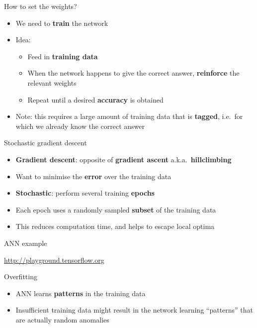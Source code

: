 \begin{frame}{How to set the weights?}
	\begin{itemize}
		\pause\item We need to \textbf{train} the network
		\pause\item Idea:
			\begin{itemize}
				\pause\item Feed in \textbf{training data}
				\pause\item When the network happens to give the correct answer, \textbf{reinforce}
					the relevant weights
				\pause\item Repeat until a desired \textbf{accuracy} is obtained
			\end{itemize}
		\pause\item Note: this requires a large amount of training data that is \textbf{tagged},
			i.e.\ for which we already know the correct answer
	\end{itemize}
\end{frame}

\begin{frame}{Stochastic gradient descent}
	\begin{itemize}
		\pause\item \textbf{Gradient descent}: opposite of \textbf{gradient ascent} a.k.a.\ \textbf{hillclimbing}
		\pause\item Want to minimise the \textbf{error} over the training data
		\pause\item \textbf{Stochastic}: perform several training \textbf{epochs}
		\pause\item Each epoch uses a randomly sampled \textbf{subset} of the training data
		\pause\item This reduces computation time, and helps to escape local optima
	\end{itemize}
\end{frame}

\begin{frame}{ANN example}
	\begin{center}
		\url{http://playground.tensorflow.org}
	\end{center}
\end{frame}

\begin{frame}{Overfitting}
	\begin{itemize}
		\pause\item ANN learns \textbf{patterns} in the training data
		\pause\item Insufficient training data might result in the network learning ``patterns''
			that are actually random anomalies
	\end{itemize}
\end{frame}
